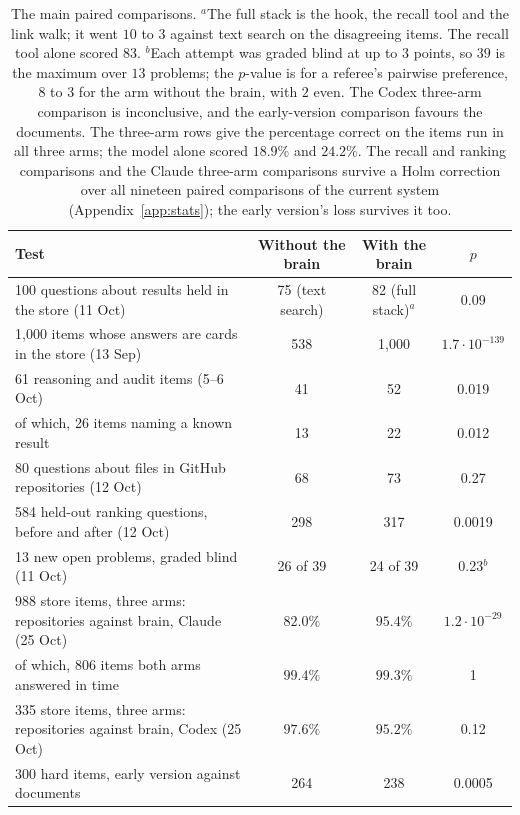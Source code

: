 \begin{table}[ht]
\centering
\small
\begin{tabular}{p{6.2cm}ccc}
\toprule
Test & Without the brain & With the brain & $p$ \\
\midrule
100 questions about results held in the store (11 Oct) & 75 (text search) & 82 (full stack)$^{a}$ & 0.09 \\
1{,}000 items whose answers are cards in the store (13 Sep) & 538 & 1{,}000 & $1.7\cdot 10^{-139}$ \\
61 reasoning and audit items (5--6 Oct) & 41 & 52 & 0.019 \\
\quad of which, 26 items naming a known result & 13 & 22 & 0.012 \\
80 questions about files in GitHub repositories (12 Oct) & 68 & 73 & 0.27 \\
584 held-out ranking questions, before and after (12 Oct) & 298 & 317 & 0.0019 \\
13 new open problems, graded blind (11 Oct) & 26 of 39 & 24 of 39 & 0.23$^{b}$ \\
988 store items, three arms: repositories against brain, Claude (25 Oct) & $82.0\%$ & $95.4\%$ & $1.2\cdot 10^{-29}$ \\
\quad of which, 806 items both arms answered in time & $99.4\%$ & $99.3\%$ & 1 \\
335 store items, three arms: repositories against brain, Codex (25 Oct) & $97.6\%$ & $95.2\%$ & 0.12 \\
300 hard items, early version against documents & 264 & 238 & 0.0005 \\
\bottomrule
\end{tabular}
\caption{The main paired comparisons. $^{a}$The full stack is the hook, the recall tool and the link walk; it went $10$ to $3$ against text search on the disagreeing items. The recall tool alone scored $83$. $^{b}$Each attempt was graded blind at up to $3$ points, so $39$ is the maximum over $13$ problems; the $p$-value is for a referee's pairwise preference, $8$ to $3$ for the arm without the brain, with $2$ even. The Codex three-arm comparison is inconclusive, and the early-version comparison favours the documents. The three-arm rows give the percentage correct on the items run in all three arms; the model alone scored $18.9\%$ and $24.2\%$. The recall and ranking comparisons and the Claude three-arm comparisons survive a Holm correction over all nineteen paired comparisons of the current system (Appendix~\ref{app:stats}); the early version's loss survives it too.}
\label{tab:intro-summary}
\end{table}

